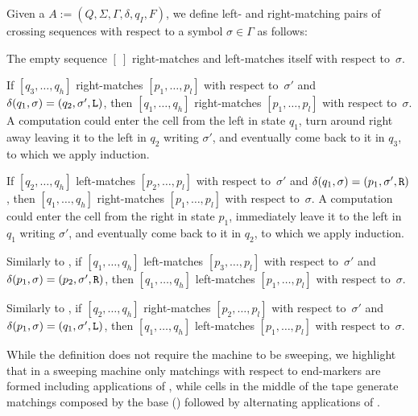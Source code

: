 \begin{defn}
	Given a \kDLA $A:=(Q,\Sigma,\Gamma,\delta,q_I,F)$, we define left- and right-matching pairs of crossing sequences with respect to a symbol $\sigma\in\Gamma$ as follows:
	\begin{rules}
		\item \label{itm:crossmatchswepDLA-1} The empty sequence $[~]$ right-matches and left-matches itself with respect to~$\sigma$.
		\item \label{itm:crossmatchswepDLA-2} If $[q_3,\dots,q_h]$ right-matches $[p_1,\dots,p_l]$ with respect to~$\sigma'$ and $\delta(q_1,\sigma)=(q_2,\sigma',\mathtt L)$, then $[q_1,\dots,q_h]$ right-matches $[p_1,\dots,p_l]$ with respect to~$\sigma$.
		A computation could enter the cell from the left in state $q_1$, turn around right away leaving it to the left in $q_2$ writing $\sigma'$, and eventually come back to it in $q_3$, to which we apply induction.
		\item \label{itm:crossmatchswepDLA-3} If $[q_2,\dots,q_h]$ left-matches $[p_2,\dots,p_l]$ with respect to~$\sigma'$ and $\delta(q_1,\sigma)=(p_1,\sigma',\mathtt R)$, then $[q_1,\dots,q_h]$ right-matches $[p_1,\dots,p_l]$ with respect to~$\sigma$.
		A computation could enter the cell from the right in state $p_1$, immediately leave it to the left in $q_1$ writing $\sigma'$, and eventually come back to it in $q_2$, to which we apply induction.
		\item \label{itm:crossmatchswepDLA-4} Similarly to , if $[q_1,\dots,q_h]$ left-matches $[p_3,\dots,p_l]$ with respect to~$\sigma'$ and $\delta(p_1,\sigma)=(p_2,\sigma',\mathtt R)$, then $[q_1,\dots,q_h]$ left-matches $[p_1,\dots,p_l]$ with respect to~$\sigma$.
		\item \label{itm:crossmatchswepDLA-5} Similarly to , if $[q_2,\dots,q_h]$ right-matches $[p_2,\dots,p_l]$ with respect to~$\sigma'$ and $\delta(p_1,\sigma)=(q_1,\sigma',\mathtt L)$, then $[q_1,\dots,q_h]$ left-matches $[p_1,\dots,p_l]$ with respect to~$\sigma$.
	\end{rules}
\end{defn}

While the definition does not require the machine to be sweeping, we highlight that in a sweeping machine only matchings with respect to end-markers are formed including applications of , while cells in the middle of the tape generate matchings composed by the base () followed by alternating applications of .

